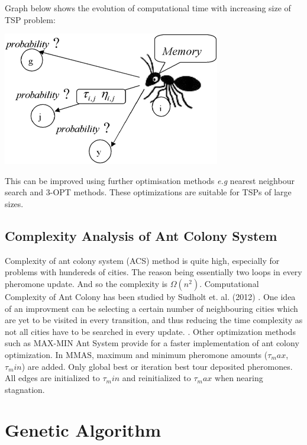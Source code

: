\documentclass[11pt, english]{article}
\begin{document}
\noindent
Graph below shows the evolution of computational time with increasing size of TSP problem:
\begin{center} \includegraphics[scale=0.2]{ant.png} \end{center}
\noindent
This can be improved using further optimisation methods \emph{e.g} nearest neighbour search and 3-OPT methods. These optimizations are suitable for TSPs of large sizes. 

\subsection{Complexity Analysis of Ant Colony System}
Complexity of ant colony system (ACS) method is quite high, especially for problems with hundereds of cities. The reason being essentially two loops in every pheromone update. And so the complexity is $\Omega(n^2)$. Computational Complexity of Ant Colony has been studied by Sudholt et. al. (2012) \cite{Sudholt2012}. One idea of an improvment can be selecting a certain number of neighbouring cities which are yet to be visited in every transition, and thus reducing the time complexity as not all cities have to be searched in every update. \cite{neumann2009computational}. Other optimization methods such as MAX-MIN Ant System provide for a faster implementation of ant colony optimization. In MMAS, maximum and minimum pheromone amounts ($\tau_max$, $\tau_min$) are added. Only global best or iteration best tour deposited pheromones. All edges are initialized to $\tau_min$ and reinitialized to $\tau_max$ when nearing stagnation.\cite{Sttzle1998}

\newpage
\section{Genetic Algorithm}
\end{document}
